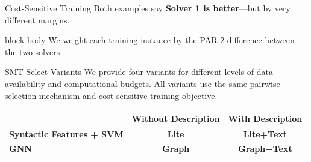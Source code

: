\documentclass[aspectratio=169,11pt]{beamer}
\begin{document}
\begin{frame}{Cost-Sensitive Training}
  \centering
  \vspace{0.55em}
  \small
  Both examples say \textbf{Solver 1 is better}---but by very different margins.

  \vspace{0.8em}

  \vfill
  \begin{beamercolorbox}[rounded=true,sep=0.55em,center]{block body}
    \small
    We weight each training instance by the PAR-2 difference between
    the two solvers.
  \end{beamercolorbox}
\end{frame}

\begin{frame}{SMT-Select Variants}
  \vspace{0.55em}
  \small
  We provide four variants for different levels of data availability
  and computational budgets. All variants use the same pairwise
  selection mechanism and cost-sensitive training objective.

  \vspace{1.25em}
  \begin{center}
    \renewcommand{\arraystretch}{2.15}
    \begin{tabular}{l c c}
      & \textbf{Without Description} & \textbf{With Description}\\ \hline
      \textbf{Syntactic Features + SVM}
        & \textbf{\textcolor{winnerblue}{Lite}}
        & \textbf{\textcolor{winnerblue}{Lite+Text}}\\
      \textbf{GNN}
        & \textbf{\textcolor{winnerblue}{Graph}}
        & \textbf{\textcolor{winnerblue}{Graph+Text}}
    \end{tabular}
  \end{center}
\end{frame}
\end{document}
